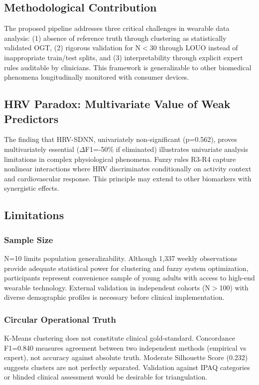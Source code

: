 \documentclass[journal,twoside,web]{ieeecolor}
\begin{document}
\subsection{Methodological Contribution}
The proposed pipeline addresses three critical challenges in wearable data analysis: (1) absence of reference truth through clustering as statistically validated OGT, (2) rigorous validation for N$<$30 through LOUO instead of inappropriate train/test splits, and (3) interpretability through explicit expert rules auditable by clinicians. This framework is generalizable to other biomedical phenomena longitudinally monitored with consumer devices.

\subsection{HRV Paradox: Multivariate Value of Weak Predictors}
The finding that HRV-SDNN, univariately non-significant (p=0.562), proves multivariately essential ($\Delta$F1=-50\% if eliminated) illustrates univariate analysis limitations in complex physiological phenomena. Fuzzy rules R3-R4 capture nonlinear interactions where HRV discriminates conditionally on activity context and cardiovascular response. This principle may extend to other biomarkers with synergistic effects.

\subsection{Limitations}

\subsubsection{Sample Size}
N=10 limits population generalizability. Although 1,337 weekly observations provide adequate statistical power for clustering and fuzzy system optimization, participants represent convenience sample of young adults with access to high-end wearable technology. External validation in independent cohorts (N$>$100) with diverse demographic profiles is necessary before clinical implementation.

\subsubsection{Circular Operational Truth}
K-Means clustering does not constitute clinical gold-standard. Concordance F1=0.840 measures agreement between two independent methods (empirical vs expert), not accuracy against absolute truth. Moderate Silhouette Score (0.232) suggests clusters are not perfectly separated. Validation against IPAQ categories or blinded clinical assessment would be desirable for triangulation.
\end{document}
